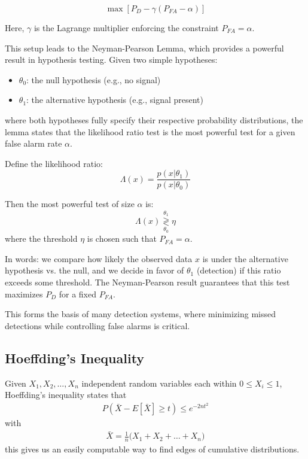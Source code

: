 \begin{equation}
	\max \left[ P_D - \gamma (P_{FA} - \alpha) \right]
\end{equation}

Here, $\gamma$ is the Lagrange multiplier enforcing the constraint $P_{FA} = \alpha$.

This setup leads to the Neyman-Pearson Lemma, which provides a powerful result in hypothesis testing. Given two simple hypotheses:
\begin{itemize}
	\item $\theta_0$: the null hypothesis (e.g., no signal)
	\item $\theta_1$: the alternative hypothesis (e.g., signal present)
\end{itemize}
where both hypotheses fully specify their respective probability distributions, the lemma states that the likelihood ratio test is the most powerful test for a given false alarm rate $\alpha$.

Define the likelihood ratio:
\begin{equation}
	\Lambda(x) = \frac{p(x | \theta_1)}{p(x | \theta_0)}
\end{equation}

Then the most powerful test of size $\alpha$ is:
\[
\Lambda(x) \underset{\theta_0}{\overset{\theta_1}{\gtrless}} \eta
\]
where the threshold $\eta$ is chosen such that $P_{FA} = \alpha$.

In words: we compare how likely the observed data $x$ is under the alternative hypothesis vs. the null, and we decide in favor of $\theta_1$ (detection) if this ratio exceeds some threshold. The Neyman-Pearson result guarantees that this test maximizes $P_D$ for a fixed $P_{FA}$.

This forms the basis of many detection systems, where minimizing missed detections while controlling false alarms is critical.

\subsection{Hoeffding's Inequality}\label{hoeffding}
Given $X_1, X_2, \ldots, X_n$ independent random variables each within $0 \leq X_i \leq 1$, Hoeffding's inequality states that 
\begin{align}
	P(\bar{X} - E[\bar{X}] \geq t) \leq e^{-2nt^2}
\end{align}
with 
\begin{align}
	\bar{X} = \frac{1}{n}\Big(X_1+X_2+\ldots+X_n\Big)
\end{align}
this gives us an easily computable way to find edges of cumulative distributions.
 
